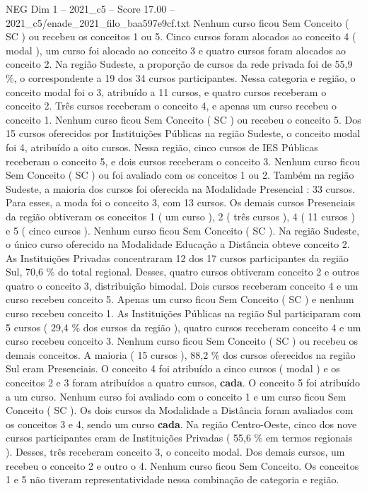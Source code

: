 \begin{textsample}{NEG Dim 1 – 2021\_c5 – Score 17.00 – 2021\_c5/enade\_2021\_filo\_baa597e9cf.txt}
Nenhum curso ficou Sem Conceito ( SC ) ou recebeu os conceitos 1 ou 5.
Cinco cursos foram alocados ao conceito 4 ( modal ), um curso foi alocado ao conceito 3 e quatro cursos foram alocados ao conceito 2.
Na região Sudeste, a proporção de cursos da rede privada foi de 55,9 \%, o correspondente a 19 dos 34 cursos participantes.
Nessa categoria e região, o conceito modal foi o 3, atribuído a 11 cursos, e quatro cursos receberam o conceito 2.
Três cursos receberam o conceito 4, e apenas um curso recebeu o conceito 1.
Nenhum curso ficou Sem Conceito ( SC ) ou recebeu o conceito 5.
Dos 15 cursos oferecidos por Instituições Públicas na região Sudeste, o conceito modal foi 4, atribuído a oito cursos.
Nessa região, cinco cursos de IES Públicas receberam o conceito 5, e dois cursos receberam o conceito 3.
Nenhum curso ficou Sem Conceito ( SC ) ou foi avaliado com os conceitos 1 ou 2.
Também na região Sudeste, a maioria dos cursos foi oferecida na Modalidade Presencial : 33 cursos.
Para esses, a moda foi o conceito 3, com 13 cursos.
Os demais cursos Presenciais da região obtiveram os conceitos 1 ( um curso ), 2 ( três cursos ), 4 ( 11 cursos ) e 5 ( cinco cursos ).
Nenhum curso ficou Sem Conceito ( SC ).
Na região Sudeste, o único curso oferecido na Modalidade Educação a Distância obteve conceito 2.
As Instituições Privadas concentraram 12 dos 17 cursos participantes da região Sul, 70,6 \% do total regional.
Desses, quatro cursos obtiveram conceito 2 e outros quatro o conceito 3, distribuição bimodal.
Dois cursos receberam conceito 4 e um curso recebeu conceito 5.
Apenas um curso ficou Sem Conceito ( SC ) e nenhum curso recebeu conceito 1.
As Instituições Públicas na região Sul participaram com 5 cursos ( 29,4 \% dos cursos da região ), quatro cursos receberam conceito 4 e um curso recebeu conceito 3.
Nenhum curso ficou Sem Conceito ( SC ) ou recebeu os demais conceitos.
A maioria ( 15 cursos ), 88,2 \% dos cursos oferecidos na região Sul eram Presenciais.
O conceito 4 foi atribuído a cinco cursos ( modal ) e os conceitos 2 e 3 foram atribuídos a quatro cursos, \textbf{cada}.
O conceito 5 foi atribuído a um curso.
Nenhum curso foi avaliado com o conceito 1 e um curso ficou Sem Conceito ( SC ).
Os dois cursos da Modalidade a Distância foram avaliados com os conceitos 3 e 4, sendo um curso \textbf{cada}.
Na região Centro-Oeste, cinco dos nove cursos participantes eram de Instituições Privadas ( 55,6 \% em termos regionais ).
Desses, três receberam conceito 3, o conceito modal.
Dos demais cursos, um recebeu o conceito 2 e outro o 4.
Nenhum curso ficou Sem Conceito.
Os conceitos 1 e 5 não tiveram representatividade nessa combinação de categoria e região.

\end{textsample}
